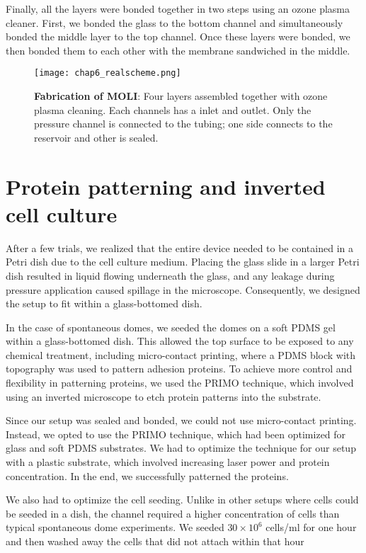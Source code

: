 Finally, all the layers were bonded together in two steps using an ozone
plasma cleaner. First, we bonded the glass to the bottom channel and
simultaneously bonded the middle layer to the top channel. Once these
layers were bonded, we then bonded them to each other with the membrane
sandwiched in the middle.

\begin{figure}[h]
	\centering
	\texttt{[image: chap6\_realscheme.png]}
	\caption{ \textbf{Fabrication of MOLI}: Four layers assembled together with ozone plasma cleaning. Each channels has a inlet and outlet. Only the pressure channel is connected to the tubing; one side connects to the reservoir and other is sealed. 
	}\label{fig_6_2}
\end{figure}


\hypertarget{protein-patterning-and-inverted-cell-culture}{%
\section{Protein patterning and inverted cell
culture}\label{protein-patterning-and-inverted-cell-culture}}

After a few trials, we realized that the entire device needed to be
contained in a Petri dish due to the cell culture medium. Placing the
glass slide in a larger Petri dish resulted in liquid flowing underneath
the glass, and any leakage during pressure application caused spillage
in the microscope. Consequently, we designed the setup to fit within a
glass-bottomed dish.

In the case of spontaneous domes, we seeded the domes on a soft PDMS gel
within a glass-bottomed dish. This allowed the top surface to be exposed
to any chemical treatment, including micro-contact printing, where a
PDMS block with topography was used to pattern adhesion proteins. To
achieve more control and flexibility in patterning proteins, we used the
PRIMO technique, which involved using an inverted microscope to etch
protein patterns into the substrate.

Since our setup was sealed and bonded, we could not use micro-contact
printing. Instead, we opted to use the PRIMO technique, which had been
optimized for glass and soft PDMS substrates. We had to optimize the
technique for our setup with a plastic substrate, which involved
increasing laser power and protein concentration. In the end, we
successfully patterned the proteins.

We also had to optimize the cell seeding. Unlike in other setups where
cells could be seeded in a dish, the channel required a higher
concentration of cells than typical spontaneous dome experiments. We
seeded \(30\times 10^6\) cells/ml for one hour and then washed away the
cells that did not attach within that hour

